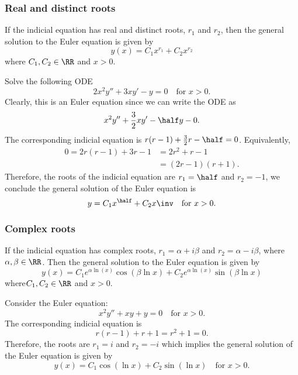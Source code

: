 \documentclass[12pt, a4paper]{article}
\begin{document}
\subsubsection{Real and distinct roots}

\begin{mdthm}
    If the indicial equation has real and distinct roots, \(r_1\) and \(r_2\), then the general solution to the Euler equation is given by 
    \[y(x) = C_1 x^{r_1}+C_2 x^{r_2}\]
    where \(C_1,C_2 \in \RR\) and \(x>0\).
\end{mdthm}

\begin{example}
    Solve the following ODE
    \[2x^2y''+3xy'-y=0 \quad \text{for } x>0.\]
    Clearly, this is an Euler equation since we can write the ODE as 
    \[x^2y''+\frac{3}{2}xy'-\half y-0.\]
    The corresponding indicial equation is \(r(r-1)+\frac{3}{2}r-\half=0\). Equivalently,
    \[\begin{aligned}
        0= 2r(r-1)+3r-1 &= 2r^2+r-1 \\
        &= (2r-1)(r+1).
    \end{aligned}\]
    Therefore, the roots of the indicial equation are \(r_1 = \half\) and \(r_2=-1\), we conclude the general solution of the Euler equation is 
    \[y=C_1 x^{\half} +C_2 x\inv \quad \text{for } x>0.\]
\end{example}

\subsubsection{Complex roots}

\begin{mdthm}
    If the indicial equation has complex roots, \(r_1= \alpha +i\beta\) and \(r_2=\alpha-i\beta\), where \(\alpha,\beta \in \RR\). Then the general solution to the Euler equation is given by 
    \[y(x) = C_1 e^{\alpha \ln(x)}\cos(\beta\ln x)+C_2 e^{\alpha \ln(x)}\sin(\beta \ln x)\]
    where\(C_1,C_2 \in \RR\) and \(x>0\).
\end{mdthm}

\begin{example}
    Consider the Euler equation:
    \[x^2y''+xy+y=0 \quad \text{for } x>0.\]
    The corresponding indicial equation is 
    \[r(r-1)+r+1 = r^2+1 =0.\]
    Therefore, the roots are \(r_1=i\) and \(r_2 =-i\) which implies the general solution of the Euler equation is given by 
    \[y(x)=C_1 \cos(\ln x)+C_2\sin(\ln x) \quad \text{for } x>0.\]
\end{example}
\end{document}
